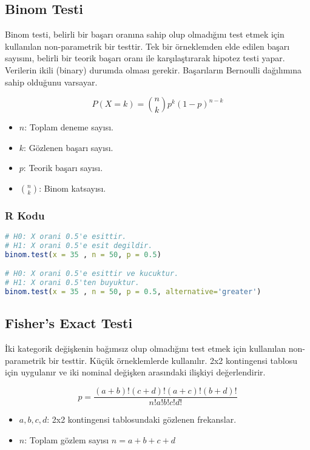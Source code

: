 \subsection{Binom Testi}
Binom testi, belirli bir başarı oranına sahip olup olmadığını test etmek için kullanılan non-parametrik bir testtir. Tek bir örneklemden elde edilen başarı sayısını, belirli bir teorik başarı oranı ile karşılaştırarak hipotez testi yapar. Verilerin ikili (binary) durumda olması gerekir. Başarıların Bernoulli dağılımına sahip olduğunu varsayar.

\[ P(X = k) = \binom{n}{k} p^k (1 - p)^{n - k} \]

\begin{itemize}
	\item $n$: Toplam deneme sayısı.
	\item $k$: Gözlenen başarı sayısı.
	\item $p$: Teorik başarı sayısı.
	\item $\binom{n}{k}$: Binom katsayısı.
\end{itemize}

\subsubsection{R Kodu}

\begin{lstlisting}[language=R]
# H0: X orani 0.5'e esittir.
# H1: X orani 0.5'e esit degildir.
binom.test(x = 35 , n = 50, p = 0.5)

# H0: X orani 0.5'e esittir ve kucuktur.
# H1: X orani 0.5'ten buyuktur.
binom.test(x = 35 , n = 50, p = 0.5, alternative='greater')
\end{lstlisting}

\newpage

\subsection{Fisher's Exact Testi}
İki kategorik değişkenin bağımsız olup olmadığını test etmek için kullanılan non-parametrik bir testtir. Küçük örneklemlerde kullanılır. 2x2 kontingensi tablosu için uygulanır ve iki nominal değişken arasındaki ilişkiyi değerlendirir.

\[ p = \frac{(a+b)!(c+d)!(a+c)!(b+d)!}{n!a!b!c!d!} \]

\begin{itemize}
	\item $a,b,c,d$: 2x2 kontingensi tablosundaki gözlenen frekanslar.
	\item $n$: Toplam gözlem sayısı $n = a + b + c + d$
\end{itemize}

